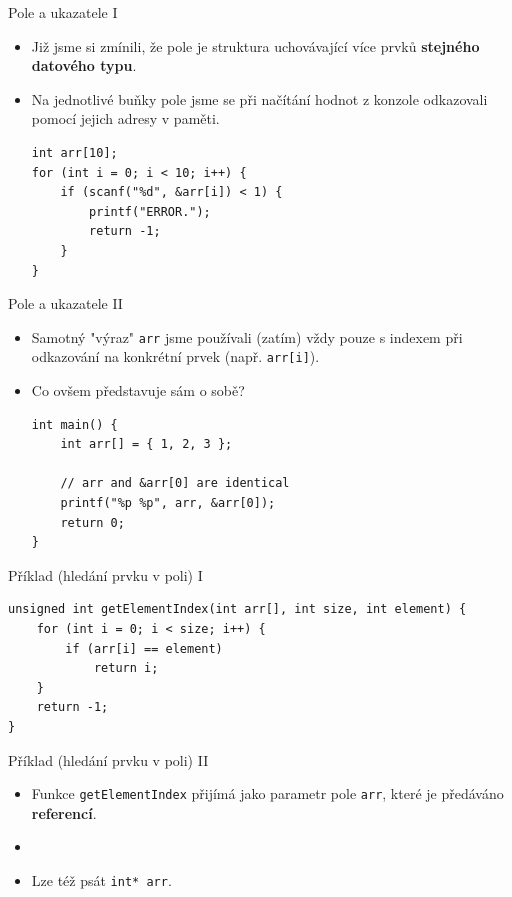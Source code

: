\documentclass[14pt,aspectratio=169]{beamer}
\begin{document}
    \begin{frame}[t,fragile]{Pole a ukazatele I}
        \begin{itemize}
            \item Již jsme si zmínili, že pole je struktura uchovávající více prvků \textbf{stejného datového typu}.
            \item Na jednotlivé buňky pole jsme se při načítání hodnot z konzole odkazovali pomocí jejich adresy v paměti.
            \begin{lstlisting}
int arr[10];
for (int i = 0; i < 10; i++) {
    if (scanf("%d", &arr[i]) < 1) {
        printf("ERROR.");
        return -1;
    }
}
            \end{lstlisting}
        \end{itemize}
    \end{frame}

    \begin{frame}[t,fragile]{Pole a ukazatele II}
        \begin{itemize}
            \item Samotný "výraz" \texttt{arr} jsme používali (zatím) vždy pouze s indexem při odkazování na konkrétní prvek (např. \texttt{arr[i]}).
            \item Co ovšem představuje sám o sobě? 
            \begin{lstlisting}
int main() {
    int arr[] = { 1, 2, 3 };

    // arr and &arr[0] are identical
    printf("%p %p", arr, &arr[0]);
    return 0;
}
            \end{lstlisting}
        \end{itemize}
    \end{frame}

    \begin{frame}[fragile]{Příklad (hledání prvku v poli) I}
        \begin{lstlisting}
unsigned int getElementIndex(int arr[], int size, int element) {
    for (int i = 0; i < size; i++) {
        if (arr[i] == element)
            return i;
    }
    return -1;
}
        \end{lstlisting}
    \end{frame}

    \begin{frame}[t]{Příklad (hledání prvku v poli) II}
        \begin{itemize}
            \item Funkce \texttt{getElementIndex} přijímá jako parametr pole \texttt{arr}, které je předáváno \textbf{referencí}.
            \item {}
            \item Lze též psát \texttt{int* arr}.
        \end{itemize}
    \end{frame}
\end{document}
